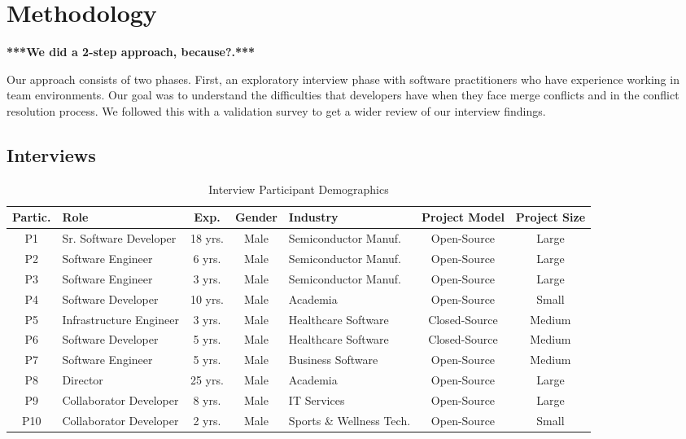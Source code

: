 \section{Methodology}\label{methodology}
\textbf{***We did a 2-step approach, because?.***}

Our approach consists of two phases. First, an exploratory interview phase with software practitioners who have experience working in team environments. Our goal was to understand the difficulties that developers have when they face merge conflicts and in the conflict resolution process. We followed this with a validation survey to get a wider review of our interview findings. 

\subsection{Interviews}

\begin{table*}[!t]
\renewcommand{\arraystretch}{1.3}
\caption{Interview Participant Demographics}
\label{interview_demographics}
\centering
\begin{tabularx}{\textwidth}{@{}cl*{2}{C}l*{2}{C}}
\toprule
	\textbf{Partic.} & \textbf{Role} & \textbf{Exp.} & \textbf{Gender} & \textbf{Industry} & \textbf{Project Model} & \textbf{Project Size}\\
\midrule
	P1 & Sr. Software Developer & 18 yrs. & Male & Semiconductor Manuf. & Open-Source & Large\\
	P2 & Software Engineer & 6 yrs. & Male & Semiconductor Manuf. & Open-Source & Large\\
	P3 & Software Engineer & 3 yrs. & Male & Semiconductor Manuf. & Open-Source & Large\\
	P4 & Software Developer & 10 yrs. & Male & Academia & Open-Source & Small\\
	P5 & Infrastructure Engineer & 3 yrs. & Male & Healthcare Software & Closed-Source & Medium\\
	P6 & Software Developer & 5 yrs. & Male & Healthcare Software & Closed-Source & Medium\\
	P7 & Software Engineer & 5 yrs. & Male & Business Software & Open-Source & Medium\\
	P8 & Director & 25 yrs. & Male & Academia & Open-Source & Large\\
	P9 & Collaborator Developer & 8 yrs. & Male & IT Services & Open-Source & Large\\
	P10 & Collaborator Developer & 2 yrs. & Male & Sports \& Wellness Tech. & Open-Source & Small\\
\bottomrule
\end{tabularx}
\end{table*}


